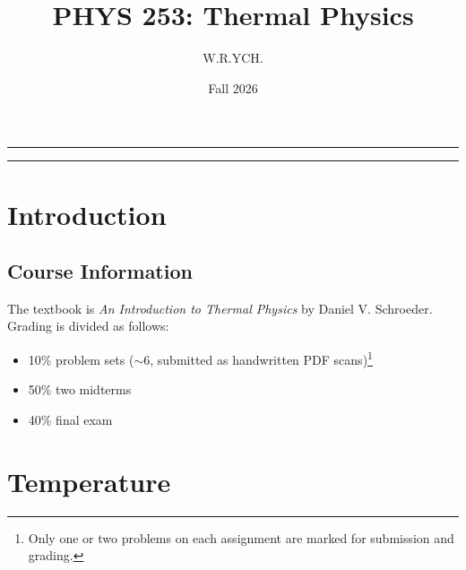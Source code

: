 \documentclass{article}
\begin{document}
\title{PHYS 253: Thermal Physics}
\author{W.R.YCH.}
\date{Fall 2026}
\setcounter{Maxaffil}{0}
\renewcommand\Affilfont{\itshape\small}
\maketitle

\noindent\rule{\textwidth}{0.4pt}
\thispagestyle{empty}
\begin{abstract}
\end{abstract}
\noindent\rule{\textwidth}{0.4pt}
\clearpage

\pagestyle{empty}
{
\hypersetup{linkcolor=black}
\tableofcontents
}
\clearpage
\pagestyle{plain}

\setcounter{page}{1}

\section{Introduction}

\subsection{Course Information}
The textbook is \textit{An Introduction to Thermal Physics} by Daniel V. Schroeder. Grading is divided as follows:
\begin{itemize}
    \item 10\% problem sets ($\sim 6$, submitted as handwritten PDF scans)\footnote{Only one or two problems on each assignment are marked for submission and grading.}
    \item 50\% two midterms
    \item 40\% final exam
\end{itemize}

\section{Temperature}
\end{document}
